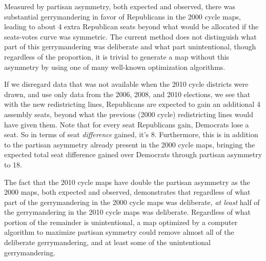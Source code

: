 \documentclass[preprint,12pt]{article}
\begin{document}
Measured by partisan asymmetry, both expected and observed, there was substantial gerrymandering in favor of Republicans in the 2000 cycle maps, leading to about 4 extra Republican seats beyond what would be allocated if the seats-votes curve was symmetric.
The current method does not distinguish what part of this gerrymandering was deliberate and what part unintentional, though regardless of the proportion, it is trivial to generate a map without this asymmetry by using one of many well-known optimization algorithms.

If we disregard data that was not available when the 2010 cycle districts were drawn, and use only data from the 2006, 2008, and 2010 elections, we see that with the new redistricting lines, Republicans are expected to gain an additional 4 assembly seats, beyond what the previous (2000 cycle) redistricting lines would have given them.
Note that for every seat Republicans gain, Democrats lose a seat.  
So in terms of seat \emph{difference} gained, it's 8.
Furthermore, this is in addition to the partisan asymmetry already present in the 2000 cycle maps, bringing the expected total seat difference gained over Democrats through partisan asymmetry to 18.

The fact that the 2010 cycle maps have double the partisan asymmetry as the 2000 maps, both expected and observed, demonstrates that regardless of what part of the gerrymandering in the 2000 cycle maps was deliberate, \emph{at least} half of the gerrymandering in the 2010 cycle maps was deliberate.
Regardless of what portion of the remainder is unintentional, a map optimized by a computer algorithm to maximize partisan symmetry could remove almost all of the deliberate gerrymandering, and at least some of the unintentional gerrymandering.
\end{document}

